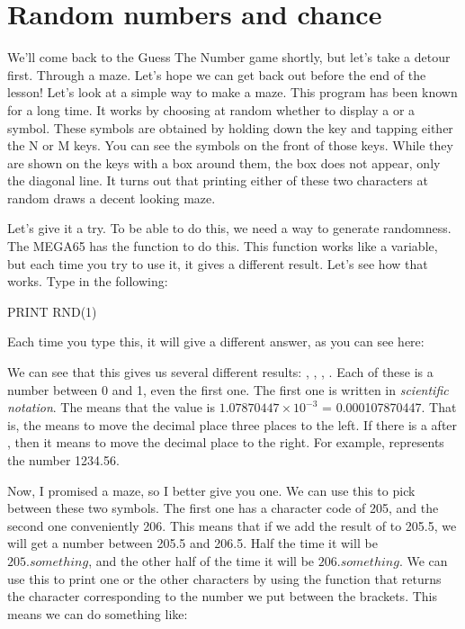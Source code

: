\section{Random numbers and chance}

We'll come back to the Guess The Number game shortly, but let's take a
detour first. Through a maze. Let's hope we can get back out before
the end of the lesson!  Let's look at a simple way to make a
maze. This program has been known for a long time.  It works by
choosing at random whether to display a {} or a
{} symbol.  These symbols are obtained by holding down
the  key and tapping either the N or M keys.  You
can see the symbols on the front of those keys.  While they are shown
on the keys with a box around them, the box does not appear, only the
diagonal line.  It turns out that printing either of these two
characters at random draws a decent looking maze.

\needspace{4cm}
Let's give it a try.  To be able to do this, we need a way to generate
randomness.  The MEGA65 has the  function to do this.  This
function works like a variable, but each time you try to use it, it
gives a different result.  Let's see how that works.  Type in the
following:

\begin{screenoutput}
PRINT RND(1)
\end{screenoutput}

Each time you type this, it will give a different answer, as you can
see here:


We can see that this gives us several different results: ,
, , .  Each of these is
a number between 0 and 1, even the first one.  The first one is
written in {\em scientific notation}.  The
 means that the value is $1.07870447\times10^{-3}$ =
0.000107870447.  That is, the  means to move the decimal
place three places to the left. If there is a \stw{+} after ,
then it means to move the decimal place to the right. For example,
 represents the number 1234.56.

\needspace{3cm}
Now, I promised a maze, so I better give you one. We can use this
 to pick between these two symbols.  The first one has a
character code of 205, and the second one conveniently 206.  This
means that if we add the result of  to 205.5, we will get
a number between 205.5 and 206.5.  Half the time it will be
$205.something$, and the other half of the time it will be $206.something$.
We can use this to print one or the other characters by using the
 function that returns the character corresponding to the
number we put between the brackets.  This means we can do something
like:


